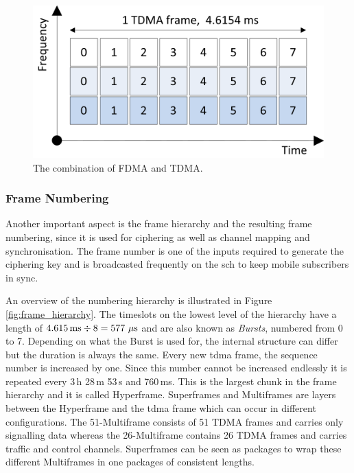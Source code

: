 \begin{figure}
	\centering
	\includegraphics{../Images/TDMAFDMA}
	\caption{The combination of FDMA and TDMA.}
	\label{fig:fdma_tdma}
\end{figure}

\subsubsection{Frame Numbering}
Another important aspect is the frame hierarchy and the resulting frame numbering, since it is used for ciphering as well as channel mapping and synchronisation.
The frame number is one of the inputs required to generate the ciphering key and is broadcasted frequently on the \gls{sch} to keep mobile subscribers in sync.

An overview of the numbering hierarchy is illustrated in Figure \ref{fig:frame_hierarchy}.
The timeslots  on the lowest level of the hierarchy have a length of $4.615\text{\,ms} \div 8 = 577~\mu\text{s}$ and are also known as \emph{Bursts}, numbered from 0 to 7.
Depending on what the Burst is used for, the internal structure can differ but the duration is always the same.
Every new \gls{tdma} frame, the sequence number is increased by one.
Since this number cannot be increased endlessly it is repeated every 3\,h 28\,m 53\,s and 760\,ms.
This is the largest chunk in the frame hierarchy and it is called Hyperframe.
Superframes and Multiframes are layers between the Hyperframe and the \gls{tdma} frame which can occur in different configurations.
The 51-Multiframe consists of 51 TDMA frames and carries only signalling data whereas the 26-Multiframe contains 26 TDMA frames and carries traffic and control channels.
Superframes can be seen as packages to wrap these different Multiframes in one packages of consistent lengths.

